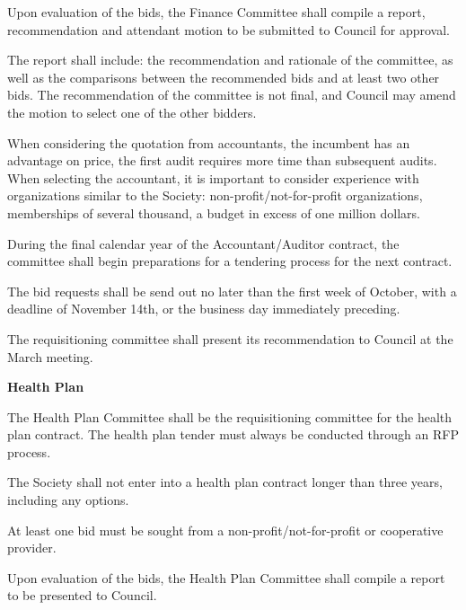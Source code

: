 \begin{longenum}[label*=\thesection.\arabic*., align=left]
\begin{longenum} [label*=\arabic*., align=left]
\begin{longenum} [label*=\arabic*., align=left]
			\item Upon evaluation of the bids, the Finance Committee shall compile a report, recommendation and attendant motion to be submitted to Council for approval. 
			
			\item The report shall include: the recommendation and rationale of the committee, as well as the comparisons between the recommended bids and at least two other bids. The recommendation of the committee is not final, and Council may amend the motion to select one of the other bidders.
			
			\item When considering the quotation from accountants, the incumbent has an advantage on price, the first audit requires more time than subsequent audits. When selecting the accountant, it is important to consider experience with organizations similar to the Society: non-profit/not-for-profit organizations, memberships of several thousand, a budget in excess of one million dollars. 
			
			\item During the final calendar year of the Accountant/Auditor contract, the committee shall begin preparations for a tendering process for the next contract.
			
			\item The bid requests shall be send out no later than the first week of October, with a deadline of November 14th, or the business day immediately preceding.
			
			\item The requisitioning committee shall present its recommendation to Council at the March meeting. 
\end{longenum}
\item \textbf{Health Plan}
		\begin{longenum} [label*=\arabic*., align=left]
			\item The Health Plan Committee shall be the requisitioning committee for the health plan contract. The health plan tender must always be conducted through an RFP process.
			
		\item 	The Society shall not enter into a health plan contract longer than three years, including any options.
			
		\item 	At least one bid must be sought from a non-profit/not-for-profit or cooperative provider.
			
		\item 	Upon evaluation of the bids, the Health Plan Committee shall compile a report to be presented to Council. 
			

\end{longenum}
\end{longenum}
\end{longenum}
